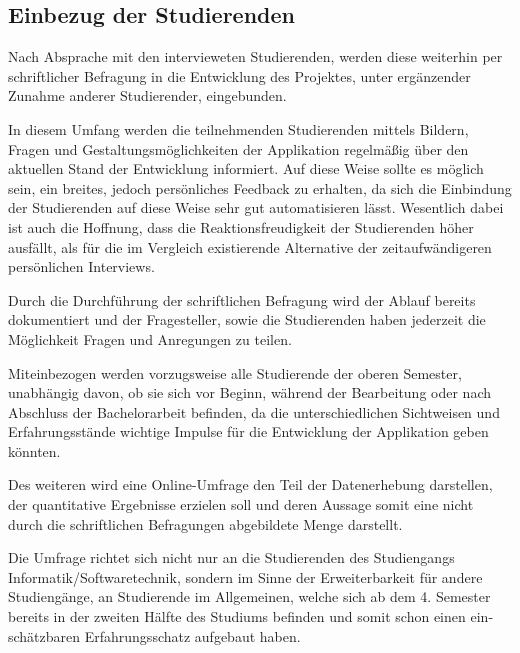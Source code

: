 \documentclass[bibliography=totoc,listof=totoc,BCOR=5mm,DIV=12,oneside]{scrbook}
\begin{document}
\subsection{Einbezug der Studierenden}
\par Nach Absprache mit den intervieweten Studierenden, werden diese weiterhin per schriftlicher Befragung in die Entwicklung des Projektes, unter ergänzender Zunahme anderer Studierender, eingebunden.
\par In diesem Umfang werden die teilnehmenden Studierenden mittels Bildern, Fragen und Gestaltungsmöglichkeiten der Applikation regelmäßig über den aktuellen Stand der Entwicklung informiert. Auf diese Weise sollte es möglich sein, ein breites, jedoch persönliches Feedback zu erhalten, da sich die Einbindung der Studierenden auf diese Weise sehr gut automatisieren lässt. Wesentlich dabei ist auch die Hoffnung, dass die Reaktionsfreudigkeit der Studierenden höher ausfällt, als für die im Vergleich existierende Alternative der zeitaufwändigeren persönlichen Interviews.
\par Durch die Durchführung der schriftlichen Befragung wird der Ablauf bereits dokumentiert und der Fragesteller, sowie die Studierenden haben jederzeit die Möglichkeit Fragen und Anregungen zu teilen.
\par Miteinbezogen werden vorzugsweise alle Studierende der oberen Semester, unabhängig davon, ob sie sich vor Beginn, während der Bearbeitung oder nach Abschluss der Bachelorarbeit befinden, da die unterschiedlichen Sichtweisen und Erfahrungsstände wichtige Impulse für die Entwicklung der Applikation geben könnten.
\par\medskip Des weiteren wird eine Online-Umfrage den Teil der Datenerhebung darstellen, der quantitative Ergebnisse erzielen soll und deren Aussage somit eine nicht durch die schriftlichen Befragungen abgebildete Menge darstellt.
\par Die Umfrage richtet sich nicht nur an die Studierenden des Studiengangs Informatik/Softwaretechnik, sondern im Sinne der Erweiterbarkeit für andere Studiengänge, an Studierende im Allgemeinen, welche sich ab dem 4. Semester bereits in der zweiten Hälfte des Studiums befinden und somit schon einen ein­schätz­baren Erfahrungsschatz aufgebaut haben.
\end{document}
